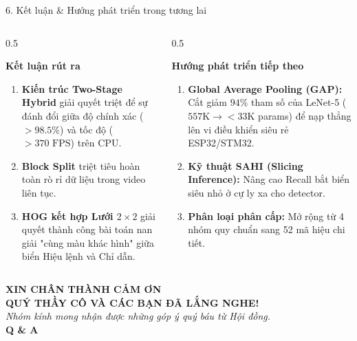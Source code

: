 \documentclass[aspectratio=169, 10pt]{beamer}
\begin{document}
\begin{frame}{6. Kết luận \& Hướng phát triển trong tương lai}
  \begin{columns}[T]
    \begin{column}{0.5\textwidth}
      \begin{block}{\textbf{Kết luận rút ra}}
        \begin{enumerate}
          \item \textbf{Kiến trúc Two-Stage Hybrid} giải quyết triệt để sự đánh đổi giữa độ chính xác ($> 98.5\%$) và tốc độ ($> 370\text{ FPS}$) trên CPU.
          \item \textbf{Block Split} triệt tiêu hoàn toàn rò rỉ dữ liệu trong video liên tục.
          \item \textbf{HOG kết hợp Lưới $2\times2$} giải quyết thành công bài toán nan giải "cùng màu khác hình" giữa biển Hiệu lệnh và Chỉ dẫn.
        \end{enumerate}
      \end{block}
    \end{column}

    \begin{column}{0.5\textwidth}
      \begin{alertblock}{\textbf{Hướng phát triển tiếp theo}}
        \begin{enumerate}
          \item \textbf{Global Average Pooling (GAP):} Cắt giảm $94\%$ tham số của LeNet-5 ($557\text{K} \rightarrow < 33\text{K}$ params) để nạp thẳng lên vi điều khiển siêu rẻ ESP32/STM32.
          \item \textbf{Kỹ thuật SAHI (Slicing Inference):} Nâng cao Recall bắt biển siêu nhỏ ở cự ly xa cho detector.
          \item \textbf{Phân loại phân cấp:} Mở rộng từ 4 nhóm quy chuẩn sang 52 mã hiệu chi tiết.
        \end{enumerate}
      \end{alertblock}
    \end{column}
  \end{columns}
\end{frame}

\begin{frame}[plain]
  \centering
  \vspace{1.2cm}
  \Huge \textcolor{uitblue}{\textbf{XIN CHÂN THÀNH CẢM ƠN}}\\[0.3cm]
  \Large \textbf{QUÝ THẦY CÔ VÀ CÁC BẠN ĐÃ LẮNG NGHE!}\\[0.8cm]
  \normalsize \textit{Nhóm kính mong nhận được những góp ý quý báu từ Hội đồng.}\\[0.6cm]
  \LARGE \textbf{Q \& A}
\end{frame}
\end{document}
